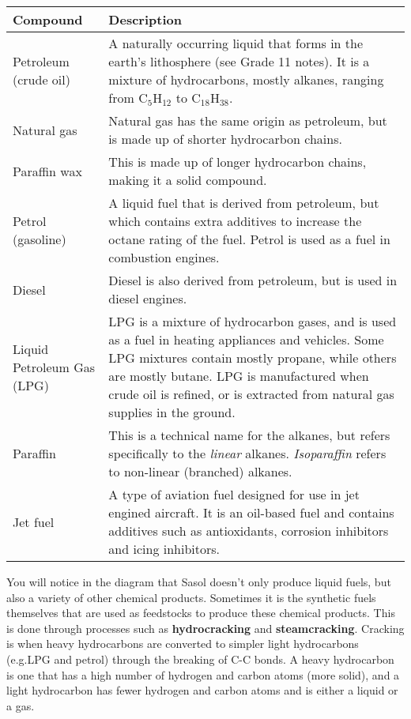 \begin{enumerate}
\begin{center}
\begin{tabular}{|p{2.5cm}|p{7.5cm}|}\hline
\textbf{Compound} & \textbf{Description} \\\hline
Petroleum (crude oil) & A naturally occurring liquid that forms in the earth's lithosphere (see Grade 11 notes). It is a mixture of hydrocarbons, mostly alkanes, ranging from C$_{5}$H$_{12}$ to C$_{18}$H$_{38}$. \\\hline
Natural gas & Natural gas has the same origin as petroleum, but is made up of shorter hydrocarbon chains.\\\hline
Paraffin wax & This is made up of longer hydrocarbon chains, making it a solid compound.\\\hline
Petrol (gasoline) & A liquid fuel that is derived from petroleum, but which contains extra additives to increase the octane rating of the fuel. Petrol is used as a fuel in combustion engines.\\\hline
Diesel & Diesel is also derived from petroleum, but is used in diesel engines.\\\hline
Liquid Petroleum Gas (LPG) & LPG is a mixture of hydrocarbon gases, and is used as a fuel in heating appliances and vehicles. Some LPG mixtures contain mostly propane, while others are mostly butane. LPG is manufactured when crude oil is refined, or is extracted from natural gas supplies in the ground.\\\hline
Paraffin & This is a technical name for the alkanes, but refers specifically to the \textit{linear} alkanes. \textit{Isoparaffin} refers to non-linear (branched) alkanes.\\\hline
Jet fuel & A type of aviation fuel designed for use in jet engined aircraft. It is an oil-based fuel and contains additives such as antioxidants, corrosion inhibitors and icing inhibitors.\\\hline
\end{tabular}
\end{center}


You will notice in the diagram that Sasol doesn't only produce liquid fuels, but also a variety of other chemical products. Sometimes it is the synthetic fuels themselves that are used as feedstocks to produce these chemical products. This is done through processes such as \textbf{hydrocracking} and \textbf{steamcracking}. Cracking is when heavy hydrocarbons are converted to simpler light hydrocarbons (e.g.\@ LPG and petrol) through the breaking of C-C bonds. A heavy hydrocarbon is one that has a high number of hydrogen and carbon atoms (more solid), and a light hydrocarbon has fewer hydrogen and carbon atoms and is either a liquid or a gas.\\


\end{enumerate}

